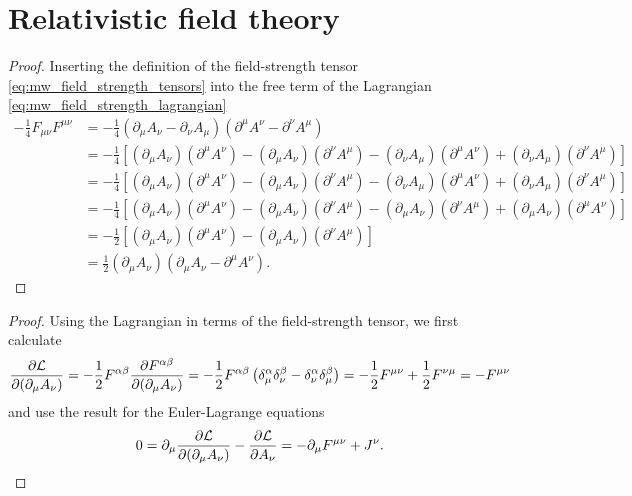 \section{Relativistic field theory}

\mwfieldstrengthlagrangian
\begin{proof}
	Inserting the definition of the field-strength tensor \cref{eq:mw_field_strength_tensors} into the free term of the Lagrangian \cref{eq:mw_field_strength_lagrangian}
	\begin{equation*}
		\begin{split}
			-
			\frac{1}{4}
			F_{\mu\nu}
			F^{\mu\nu}
			&=
			-
			\frac{1}{4}
			\left(
				\partial_\mu A_\nu
				-
				\partial_\nu A_\mu
			\right)
			\left(
				\partial^\mu A^\nu
				-
				\partial^\nu A^\mu
			\right)
			\\
			&=
			-
			\frac{1}{4}
			\left[
				(\partial_\mu A_\nu)
				(\partial^\mu A^\nu)
				-
				(\partial_\mu A_\nu)
				(\partial^\nu A^\mu)
				-
				(\partial_\nu A_\mu)
				(\partial^\mu A^\nu)
				+
				(\partial_\nu A_\mu)
				(\partial^\nu A^\mu)
			\right]
			\\
			&=
			-
			\frac{1}{4}
			\left[
				(\partial_\mu A_\nu)
				(\partial^\mu A^\nu)
				-
				(\partial_\mu A_\nu)
				(\partial^\nu A^\mu)
				-
				(\partial_\nu A_\mu)
				(\partial^\mu A^\nu)
				+
				(\partial_\nu A_\mu)
				(\partial^\nu A^\mu)
			\right]
			\\
			&=
			-
			\frac{1}{4}
			\left[
				(\partial_\mu A_\nu)
				(\partial^\mu A^\nu)
				-
				(\partial_\mu A_\nu)
				(\partial^\nu A^\mu)
				-
				(\partial_\mu A_\nu)
				(\partial^\nu A^\mu)
				+
				(\partial_\mu A_\nu)
				(\partial^\mu A^\nu)
			\right]
			\\
			&=
			-
			\frac{1}{2}
			\left[
				(\partial_\mu A_\nu)
				(\partial^\mu A^\nu)
				-
				(\partial_\mu A_\nu)
				(\partial^\nu A^\mu)
			\right]
			\\
			&=
			\frac{1}{2}
			(\partial_\mu A_\nu)
			\left(
				\partial_\mu A_\nu
				-
				\partial^\mu A^\nu
			\right)
			.
		\end{split}
	\end{equation*}
\end{proof}
\mweom
\begin{proof}
	Using the Lagrangian in terms of the field-strength tensor, we first calculate
	\begin{equation*}
		\pdv{\mathcal{L}}{(\partial_\mu A_\nu)}
		=
		-
		\frac{1}{2}
		F^{\alpha\beta}
		\pdv{F^{\alpha\beta}}{(\partial_\mu A_\nu)}
		=
		-
		\frac{1}{2}
		F^{\alpha\beta}
		\left(
			\delta^\alpha_\mu
			\delta^\beta_\nu
			-
			\delta^\alpha_\nu
			\delta^\beta_\mu
		\right)
		=
		-
		\frac{1}{2}
		F^{\mu\nu}
		+
		\frac{1}{2}
		F^{\nu\mu}
		=
		-
		F^{\mu\nu}
	\end{equation*}
	and use the result for the Euler-Lagrange equations
	\begin{equation*}
		0
		=
		\partial_\mu
		\pdv{\mathcal{L}}{(\partial_\mu A_\nu)}
		-
		\pdv{\mathcal{L}}{A_\nu}
		=
		-
		\partial_\mu
		F^{\mu\nu}
		+
		J^\nu
		.
	\end{equation*}
\end{proof}


